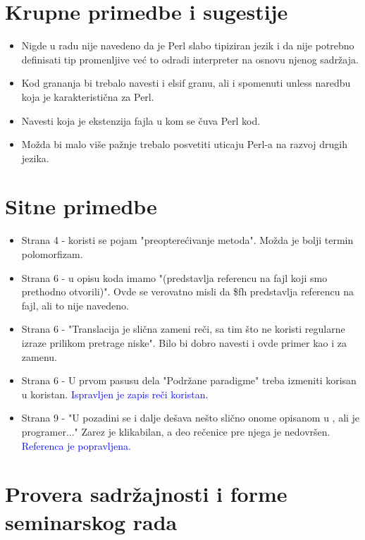 \documentclass[a4paper]{report}
\newcommand{\odgovor}[1]{\textcolor{blue}{#1}}
\begin{document}
\section{Krupne primedbe i sugestije}
\begin{itemize}
\item Nigde u radu nije navedeno da je Perl slabo tipiziran jezik i da nije potrebno definisati tip promenljive već to odradi interpreter na osnovu njenog sadržaja.
\item Kod grananja bi trebalo navesti i elsif granu, ali i spomenuti unless naredbu koja je karakteristična za Perl.
\item Navesti koja je ekstenzija fajla u kom se čuva Perl kod.
\item Možda bi malo više pažnje trebalo posvetiti uticaju Perl-a na razvoj drugih jezika.
\end{itemize}

\section{Sitne primedbe}
\begin{itemize}
\item Strana 4 - koristi se pojam "preopterećivanje metoda". Možda je bolji termin polomorfizam.
\item Strana 6 - u opisu koda imamo "(predstavlja referencu na fajl koji smo prethodno otvorili)". Ovde se verovatno misli da \$fh predstavlja referencu na fajl, ali to nije navedeno.
\item Strana 6 - "Translacija je slična zameni reči, sa tim što ne koristi regularne izraze prilikom pretrage niske". Bilo bi dobro navesti i ovde primer kao i za zamenu.
\item Strana 6 - U prvom pasusu dela "Podržane paradigme" treba izmeniti korisan u koristan.
\odgovor{ Ispravljen je zapis reči koristan. }
\item Strana 9 - "U pozadini se i dalje dešava nešto slično onome opisanom u , ali je programer..." Zarez je klikabilan, a deo rečenice pre njega je nedovršen.
\odgovor{ Referenca je popravljena. }
\end{itemize}
\section{Provera sadržajnosti i forme seminarskog rada}
\end{document}
